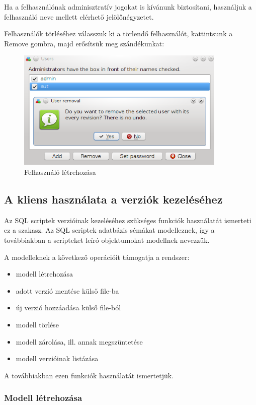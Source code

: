 \documentclass[a4paper,12pt]{article}
\begin{document}
Ha a felhasználónak adminisztratív jogokat is kívánunk biztosítani, használjuk
a felhasználó neve mellett elérhető jelölőnégyzetet.

Felhasználók törléséhez válasszuk ki a törlendő felhasználót, kattintsunk a
Remove gombra, majd erősítsük meg szándékunkat:

\begin{figure}[H]
\centering
\includegraphics[width=100mm,keepaspectratio]{user-delete.png}
\caption{Felhasználó létrehozása}
\end{figure}

\subsection{A kliens használata a verziók kezeléséhez}

Az SQL scriptek verzióinak kezeléséhez szükséges funkciók használatát ismerteti
ez a szakasz. Az SQL scriptek adatbázis sémákat modelleznek, így a továbbiakban
a scripteket leíró objektumokat modellnek nevezzük.

A modelleknek a következő operációit támogatja a rendszer:

\begin{itemize}
\item modell létrehozása
\item adott verzió mentése külső file-ba
\item új verzió hozzáadása külső file-ból
\item modell törlése
\item modell zárolása, ill. annak megszüntetése
\item modell verzióinak listázása
\end{itemize}

A továbbiakban ezen funkciók használatát ismertetjük.

\subsubsection{Modell létrehozása}
\end{document}
